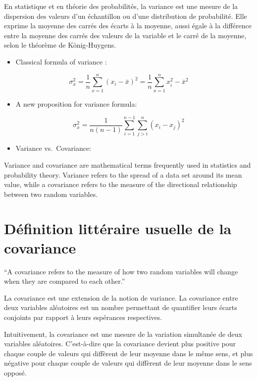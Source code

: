 \documentclass[
]{report}
\providecommand{\tightlist}{%
  \setlength{\itemsep}{0pt}\setlength{\parskip}{0pt}}
\begin{document}
En statistique et en théorie des probabilités, la variance est une mesure de la dispersion des valeurs d'un échantillon ou d'une distribution de probabilité. Elle exprime la moyenne des carrés des écarts à la moyenne, aussi égale à la différence entre la moyenne des carrés des valeurs de la variable et le carré de la moyenne, selon le théorème de König-Huygens.

\begin{itemize}
\tightlist
\item
  Classical formula of variance :
\end{itemize}

\[\sigma^2_x=\frac{1}{n}\sum_{x=1}^{n}(x_i - \bar{x})^2 = \frac{1}{n}\sum_{x=1}^{n}x_i^2 - \bar{x}^2 \]

\begin{itemize}
\tightlist
\item
  A new proposition for variance formula\citep{Heffernan}:
\end{itemize}

\[\sigma^2_x= \frac{1}{n(n-1)}\sum_{i=1}^{n-1}\sum_{j>i}^{n}(x_i-x_j)^2\]

\begin{itemize}
\tightlist
\item
  Variance vs.~Covariance:
\end{itemize}

Variance and covariance are mathematical terms frequently used in statistics and probability theory. Variance refers to the spread of a data set around its mean value, while a covariance refers to the measure of the directional relationship between two random variables.

\hypertarget{duxe9finition-littuxe9raire-usuelle-de-la-covariance}{%
\section{Définition littéraire usuelle de la covariance}\label{duxe9finition-littuxe9raire-usuelle-de-la-covariance}}

``A covariance refers to the measure of how two random variables will change when they are compared to each other.''

La covariance est une extension de la notion de variance. La covariance entre deux variables aléatoires est un nombre permettant de quantifier leurs écarts conjoints par rapport à leurs espérances respectives.

Intuitivement, la covariance est une mesure de la variation simultanée de deux variables aléatoires. C'est-à-dire que la covariance devient plus positive pour chaque couple de valeurs qui diffèrent de leur moyenne dans le même sens, et plus négative pour chaque couple de valeurs qui diffèrent de leur moyenne dans le sens opposé.
\end{document}
